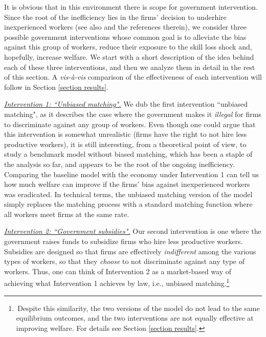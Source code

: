 \documentclass[12pt]{article} %
\theoremstyle{definition}
\begin{document}
  
It is obvious that in this environment there is scope for government intervention. Since the root of the inefficiency lies in the firms' decision to underhire inexperienced workers (see also \cite{pallais2014inefficient} and the references therein), we consider three possible government interventions whose common goal is to alleviate the bias against this group of workers, reduce their exposure to the skill loss shock and, hopefully, increase welfare. We start with a short description of the idea behind each of these three interventions, and then we analyze them in detail in the rest of this section. A \textit{vis-\`a-vis} comparison of the effectiveness of each intervention will follow in Section \ref{section results}. 

\medskip

\underline{\textit{Intervention 1: ``Unbiased matching".}} We dub the first intervention ``unbiased matching", as it describes the case where the government makes it \textit{illegal} for firms to discriminate against any group of workers. Even though one could argue that this intervention is somewhat unrealistic (firms have the right to not hire less productive workers), it is still interesting, from a theoretical point of view, to study a benchmark model without biased matching, which has been a staple of the analysis so far, and appears to be the root of the ongoing inefficiency. Comparing the baseline model with the economy under Intervention 1 can tell us how much welfare can improve if the firms' bias against inexperienced workers was eradicated. In technical terms, the unbiased matching version of the model simply replaces the \cite{petrongolo2001looking} matching process with a standard \cite{pissarides2000equilibrium} matching function where all workers meet firms at the same rate. 

\medskip

\underline{\textit{Intervention 2: ``Government subsidies".}} Our second intervention is one where the government raises funds to subsidize firms who hire less productive workers. Subsidies are designed so that firms are effectively \textit{indifferent} among the various types of workers, so that they \textit{choose} to not discriminate against any type of workers. Thus, one can think of Intervention 2 as a market-based way of achieving what Intervention 1 achieves by law, i.e., unbiased matching.\footnote{\,Despite this similarity, the two versions of the model do not lead to the same equilibrium outcomes, and the two interventions are not equally effective at improving welfare. For details see Section \ref{section results}.} 
\end{document}

